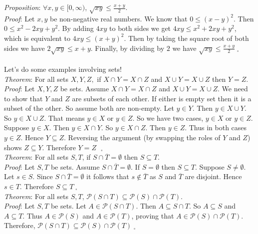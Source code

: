 \documentclass[12pt]{amsart}
\theoremstyle{definition}
\theoremstyle{remark}
\newcommand{\powerset}{\mathscr P}
\begin{document}
\emph{Proposition}:  $\forall x,y\in [0,\infty)$, $\displaystyle \sqrt{xy}\leq \frac{x+y}{2}$.\\

\emph{Proof}:  Let $x,y$ be non-negative real numbers.  We know that $0\leq (x-y)^2$.  Then\\ $0\leq x^2-2xy+y^2$.  By adding $4xy$ to both sides we get $4xy\leq x^2+2xy+y^2$, which is equivalent to $4xy\leq (x+y)^2$.  Then by taking the square root of both sides we have $2\sqrt{xy}\leq x+y$. Finally, by dividing by $2$ we have $\displaystyle \sqrt{xy}\leq \frac{x+y}{2}\;_{\square}$\\ \\


Let's do some examples involving sets!\\

\emph{Theorem}: For all sets $X,Y,Z,$  if $X\cap Y=X\cap Z$ and $X\cup Y=X\cup Z$ then $Y=Z$.\\


\emph{Proof}:  Let $X,Y,Z$ be sets.  Assume $X\cap Y=X\cap Z$ and $X\cup Y=X\cup Z$.  We need to show that $Y$ and $Z$ are subsets of each other.  If either is empty set then it is a subset of the other.  So assume both are non-empty.  Let $y\in Y$.  Then $y\in X\cup Y$.  So $y\in X\cup Z$.  That means $y\in X$ or $y\in Z$.  So we have two cases, $y\in X$ or $y\in Z$.  Suppose $y\in X$.  Then $y\in X\cap Y$.  So $y\in X\cap Z$.  Then $y\in Z$.  Thus in both cases $y\in Z$.  Hence $Y\subseteq Z$.  Reversing the argument (by swapping the roles of $Y$ and $Z$) shows $Z\subseteq Y$.  Therefore $Y=Z\mbox{ }_{\square}$\\

\emph{Theorem}:  For all sets $S,T$, if $S\cap \overline{T}=\emptyset$ then $S\subseteq T$.\\

\emph{Proof}:  Let $S,T$ be sets.  Assume $S\cap \overline{T}=\emptyset$.  If $S=\emptyset$ then $S\subseteq T$.  Suppose $S\neq \emptyset$.  Let $s\in S$.  Since $S\cap \overline{T}=\emptyset$ it follows that $s\not\in \overline{T}$ as $S$ and $\overline{T}$ are disjoint.  Hence $s\in T$.  Therefore $S\subseteq T\;_{\square}$\\

\emph{Theorem}:  For all sets $S,T$, $\powerset{(S\cap T)}\subseteq \powerset{(S)}\cap \powerset{(T)}$.\\

\emph{Proof}:  Let $S,T$ be sets.  Let $A\in \powerset{(S\cap T)}$.  Then $A\subseteq S\cap T$.  So $A\subseteq S$ and $A\subseteq T$.  Thus $A\in \powerset{(S)}$ and $A\in \powerset{(T)}$, proving that $A\in \powerset{(S)}\cap \powerset{(T)}$.  Therefore, $\powerset{(S\cap T)}\subseteq \powerset{(S)}\cap \powerset{(T)}\;_{\square}$
\end{document}
